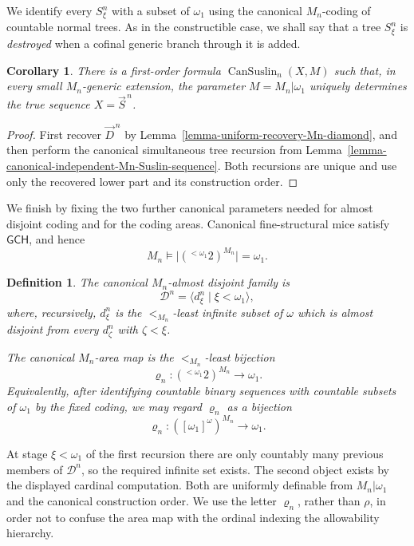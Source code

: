 \documentclass[a4paper,11pt]{article}
\newtheorem{corollary}[theorem]{Corollary}
\newtheorem{definition}[theorem]{Definition}
\newcommand{\GCH}{\mathsf{GCH}}
\begin{document}
We identify every $S^n_\xi$ with a subset of $\omega_1$ using the canonical
$M_n$-coding of countable normal trees.  As in the constructible case, we
shall say that a tree $S^n_\xi$ is \emph{destroyed} when a cofinal generic
branch through it is added.

\begin{corollary}
\label{corollary-uniform-recovery-Mn-Suslin-sequence}
There is a first-order formula
$\operatorname{CanSuslin}_n(X,M)$ such that, in every small
$M_n$-generic extension, the parameter
$M=M_n|\omega_1$ uniquely determines the true sequence
$X=\vec S^{\,n}$.
\end{corollary}

\begin{proof}
First recover $\vec D^{\,n}$ by
Lemma~\ref{lemma-uniform-recovery-Mn-diamond}, and then perform the canonical
simultaneous tree recursion from
Lemma~\ref{lemma-canonical-independent-Mn-Suslin-sequence}.  Both recursions
are unique and use only the recovered lower part and its construction order.
\end{proof}

We finish by fixing the two further canonical parameters needed for almost
disjoint coding and for the coding areas.  Canonical fine-structural mice
satisfy $\GCH$, and hence
\[
   M_n\models
   \bigl|({}^{<\omega_1}2)^{M_n}\bigr|=\omega_1.
\]

\begin{definition}
\label{definition-canonical-coding-parameters-Mn}
The \emph{canonical $M_n$-almost disjoint family} is
\[
   \mathcal D^n
   =\langle d^n_\xi\mid\xi<\omega_1\rangle,
\]
where, recursively, $d^n_\xi$ is the $<_{M_n}$-least infinite subset of
$\omega$ which is almost disjoint from every $d^n_\zeta$ with
$\zeta<\xi$.

The \emph{canonical $M_n$-area map} is the $<_{M_n}$-least bijection
\[
   \varrho_n:({}^{<\omega_1}2)^{M_n}
      \longrightarrow\omega_1.
\]
Equivalently, after identifying countable binary sequences with countable
subsets of $\omega_1$ by the fixed coding, we may regard $\varrho_n$ as a
bijection
\[
   \varrho_n:([\omega_1]^\omega)^{M_n}
      \longrightarrow\omega_1.
\]
\end{definition}

At stage $\xi<\omega_1$ of the first recursion there are only countably many
previous members of $\mathcal D^n$, so the required infinite set exists.  The
second object exists by the displayed cardinal computation.  Both are
uniformly definable from $M_n|\omega_1$ and the canonical
construction order.  We use the letter $\varrho_n$, rather than $\rho$, in
order not to confuse the area map with the ordinal indexing the allowability
hierarchy.
\end{document}
